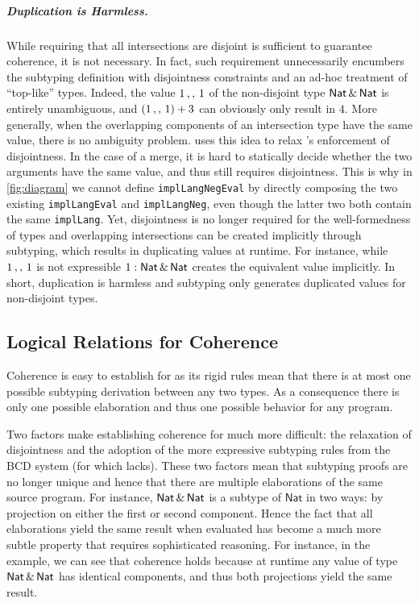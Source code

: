 \subparagraph{Duplication is Harmless.}
While requiring that all intersections are disjoint is sufficient to guarantee
coherence, it is not necessary. In fact,
such requirement unnecessarily encumbers the subtyping definition with disjointness constraints
and an ad-hoc treatment of ``top-like'' types. Indeed, the value $1 \, ,, \, 1$
of the non-disjoint type $\mathsf{Nat} \,\&\, \mathsf{Nat}$ is entirely unambiguous, and
$(1 \, ,, \, 1) + 3$ can obviously only result in $4$. More generally, when the
overlapping components of an intersection type have the same value, there is no
ambiguity problem. \name uses this idea to relax \oname's enforcement of
disjointness. In the case of a merge, it is hard to statically decide whether
the two arguments have the same value, and thus \name still requires
disjointness. This is why in \cref{fig:diagram} we cannot define
\lstinline{implLangNegEval} by directly composing the two existing
\lstinline{implLangEval} and \lstinline{implLangNeg}, even though the latter two
both contain the same \lstinline{implLang}.
Yet, disjointness is no longer required for the well-formedness
of types and overlapping intersections can be created implicitly through
subtyping, which results in duplicating values at runtime. For instance, while
$1 \, ,, \, 1$ is not expressible
$ 1 : \mathsf{Nat} \,\&\, \mathsf{Nat}$ creates the equivalent value implicitly.
In short, duplication is harmless and subtyping only generates duplicated
values for non-disjoint types.


\subsection{Logical Relations for Coherence}

Coherence is easy to establish for \oname as its rigid rules mean that there is
at most one possible subtyping derivation between any two types.  As a
consequence there is only one possible elaboration and thus one
possible behavior for any program.

Two factors make establishing coherence for \name much more difficult: the
relaxation of disjointness and the adoption of the more expressive subtyping
rules from the BCD system (for which \oname lacks). These two factors mean that subtyping proofs are no
longer unique and hence that there are multiple elaborations of the same source
program. For instance, $\mathsf{Nat} \,\&\, \mathsf{Nat}$ is a subtype of $\mathsf{Nat}$ in two
ways: by projection on either the first or second component.
Hence the fact that all elaborations yield the same result when evaluated has
become a much more subtle property that requires sophisticated reasoning.
For instance, in the example, we can see that coherence holds because  at
runtime any value of type $\mathsf{Nat} \,\&\, \mathsf{Nat}$ has identical components, and
thus both projections yield the same result.

